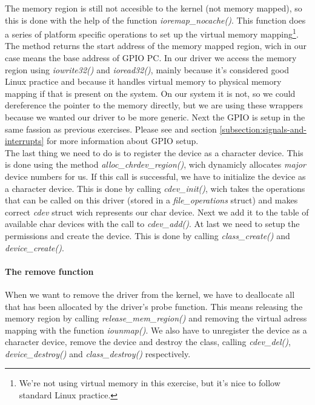 The memory region is still not accesible to the kernel (not memory mapped), so this is done with the help of the function \emph{ioremap\_nocache()}. This function does a series of platform specific operations to set up the virtual memory mapping\footnote{We're not using virtual memory in this exercise, but it's nice to follow standard Linux practice.}. The method returns the start address of the memory mapped region, wich in our case means the base address of GPIO PC. In our driver we access the memory region using \emph{iowrite32()} and \emph{ioread32()}, mainly because it's considered good Linux practice and because it handles virtual memory to physical memory mapping if that is present on the system. On our system it is not, so we could dereference the pointer to the memory directly, but we are using these wrappers because we wanted our driver to be more generic. Next the GPIO is setup in the same fassion as previous exercises. Please see \cite[section 3]{compendium} and section \ref{subsection:signals-and-interrupts} for more information about GPIO setup. \\

The last thing we need to do is to register the device as a character device. This is done using the method \emph{alloc\_chrdev\_region()}, wich dynamicly allocates \emph{major} device numbers for us. If this call is successful, we have to initialize the device as a character device. This is done by calling \emph{cdev\_init()}, wich takes the operations that can be called on this driver (stored in a \emph{file\_operations} struct) and makes correct \emph{cdev} struct wich represents our char device. Next we add it to the table of available char devices with the call to \emph{cdev\_add()}. At last we need to setup the permissions and create the device. This is done by calling \emph{class\_create()} and \emph{device\_create()}.     


\paragraph{The remove function}

When we want to remove the driver from the kernel, we have to deallocate all that has been allocated by the driver's probe function. This means releasing the memory region by calling \emph{release\_mem\_region()} and removing the virtual adress mapping with the function \emph{iounmap()}. We also have to unregister the device as a character device, remove the device and destroy the class, calling \emph{cdev\_del()}, \emph{device\_destroy()} and \emph{class\_destroy()} respectively. 

